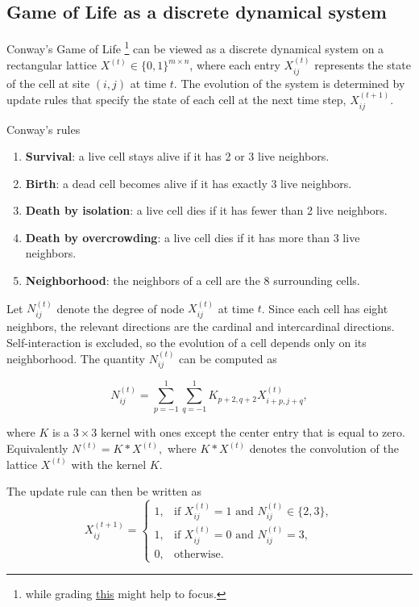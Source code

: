 \subsection{Game of Life as a discrete dynamical system}
Conway's Game of Life
\footnote{while grading \href{https://www.youtube.com/watch?v=NJ1VD4eCcD0}{this} might help to focus.} can be viewed as a discrete dynamical system on a rectangular
lattice $X^{(t)} \in \{0,1\}^{m \times n}$, where each entry $X_{ij}^{(t)}$ represents the state of the cell
at site $(i,j)$ at time $t$. The evolution of the system is determined by update rules that specify
the state of each cell at the next time step, $X_{ij}^{(t+1)}$.

\begin{definitionbox}[label=conwayrules]{Conway's rules \cite{GoLInteractiveCode}}
\begin{enumerate}
\item \textbf{Survival}: a live cell stays alive if it has 2 or 3 live neighbors.
\item \textbf{Birth}: a dead cell becomes alive if it has exactly 3 live neighbors.
\item \textbf{Death by isolation}: a live cell dies if it has fewer than 2 live neighbors.
\item \textbf{Death by overcrowding}: a live cell dies if it has more than 3 live neighbors.
\item \textbf{Neighborhood}: the neighbors of a cell are the 8 surrounding cells.
\end{enumerate}
\end{definitionbox}

Let $N_{ij}^{(t)}$ denote the degree of node $X_{ij}^{(t)}$ at time $t$.
Since each cell has eight neighbors, the relevant directions are the cardinal and intercardinal
directions. Self-interaction is excluded, so the evolution of a cell depends only on its neighborhood.
The quantity $N_{ij}^{(t)}$ can be computed as

\begin{equation}
N_{ij}^{(t)} =
\sum_{p=-1}^1 \sum_{q=-1}^1 K_{p+2,q+2} X_{i+p,j+q}^{(t)},
\end{equation}

where $K$ is a $3 \times 3$ kernel with ones except the center entry that is equal to zero. Equivalently $N^{(t)} = K * X^{(t)},$
where $K * X^{(t)}$ denotes the convolution of the lattice $X^{(t)}$ with the kernel $K$.

The update rule can then be written as
\begin{equation}
X_{ij}^{(t+1)}
=
\begin{cases}
1, & \text{if } X_{ij}^{(t)} = 1 \text{ and } N_{ij}^{(t)} \in \{2,3\}, \\
1, & \text{if } X_{ij}^{(t)} = 0 \text{ and } N_{ij}^{(t)} = 3, \\
0, & \text{otherwise}.
\end{cases}
\end{equation}

